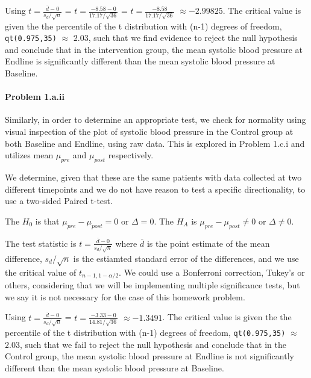 \documentclass[
]{article}
\begin{document}
Using \(t=\frac{\overline d-0}{s_{d} / \sqrt{n}}\) =
\(t=\frac{-8.58 -0}{17.17/ \sqrt{36}}\) =
\(t=\frac{-8.58}{17.17/ \sqrt{36}}\) \(\approx -2.99825\). The critical
value is given the the percentile of the t distribution with (n-1)
degrees of freedom, \texttt{qt(0.975,35)} \(\approx\) \(2.03\), such
that we find evidence to reject the null hypothesis and conclude that in
the intervention group, the mean systolic blood pressure at Endline is
significantly different than the mean systolic blood pressure at
Baseline.

\hypertarget{problem-1.a.ii}{%
\paragraph{Problem 1.a.ii}\label{problem-1.a.ii}}

Similarly, in order to determine an appropriate test, we check for
normality using visual inspection of the plot of systolic blood pressure
in the Control group at both Baseline and Endline, using raw data. This
is explored in Problem 1.c.i and utilizes mean \(\mu_{pre}\) and
\(\mu_{post}\) respectively.

We determine, given that these are the same patients with data collected
at two different timepoints and we do not have reason to test a specific
directionality, to use a two-sided Paired t-test.

The \(H_0\) is that \(\mu_{pre} -\mu_{post} = 0\) or \(\Delta = 0\). The
\(H_A\) is \(\mu_{pre} -\mu_{post} \neq 0\) or \(\Delta \neq 0\).

The test statistic is \(t=\frac{\overline d-0}{s_{d} / \sqrt{n}}\) where
\(\overline d\) is the point estimate of the mean difference,
\(s_{d} / \sqrt{n}\) is the estiamted standard error of the differences,
and we use the critical value of \(t_{n-1,1-{\alpha/2}}\). We could use
a Bonferroni correction, Tukey's or others, considering that we will be
implementing multiple significance tests, but we say it is not necessary
for the case of this homework problem.

Using \(t=\frac{\overline d-0}{s_{d} / \sqrt{n}}\) =
\(t=\frac{-3.33 -0}{14.81/ \sqrt{36}}\) \(\approx - 1.3491\). The
critical value is given the the percentile of the t distribution with
(n-1) degrees of freedom, \texttt{qt(0.975,35)} \(\approx\) \(2.03\),
such that we fail to reject the null hypothesis and conclude that in the
Control group, the mean systolic blood pressure at Endline is not
significantly different than the mean systolic blood pressure at
Baseline.
\end{document}
